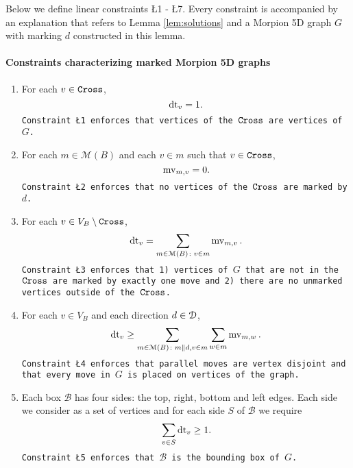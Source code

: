 Below we define linear constraints \L{1} - \L{7}. Every constraint is accompanied by an explanation that refers to Lemma \ref{lem:solutions}
and a Morpion 5D graph $G$ with marking $d$ constructed in this lemma.
\paragraph*{Constraints characterizing marked Morpion 5D graphs} 
  \begin{enumerate}[label=\L{\arabic*}.]
  \item  For each $v \in \texttt{Cross}$,
  \[
    \operatorname{dt}_v = 1.
  \]
\noindent\texttt{\small Constraint \L{1} enforces that vertices of the $\texttt{Cross}$ are vertices of $G$.} %
\vspace{1mm}
  
  \item For each $m \in \mathcal{M}(B)$ and each $v \in m$ such that $v \in \texttt{Cross}$,
  \[
    \operatorname{mv}_{m, v} = 0.
  \]
\noindent\texttt{\small Constraint \L{2} enforces that no vertices of the $\texttt{Cross}$ are marked by $d$. }
\vspace{1mm}

  \item For each $v \in V_B \setminus \texttt{Cross}$, 
  \[ 
    \operatorname{dt}_v = \sum_{m \in \mathcal{M}(B) \colon v \in m} \operatorname{mv}_{m, v}.
  \]
\noindent\texttt{\small Constraint \L{3} enforces that 1) vertices of $G$ that are not in the $\texttt{Cross}$ are 
  marked by exactly one move and 2) there are no unmarked vertices outside of the $\texttt{Cross}$. }
\vspace{1mm}

  \item For each $v \in V_B$ and each direction $d \in \mathcal{D}$,
  \[
  	\operatorname{dt}_v \geq \sum_{m \in \mathcal{M}(B) \colon m \parallel d, v \in m} \sum_{w \in m} \operatorname{mv}_{m, w}.
  \]
\noindent\texttt{\small Constraint \L{4} enforces that parallel moves are vertex disjoint
  and that  every move in $G$ is placed on vertices of the graph. }
\vspace{1mm}

  \item Each box $\mathcal{B}$ has four sides: the top, right, bottom and left edges. Each side we consider as a set of vertices and for each side $S$ of $\mathcal{B}$ we require %
  \[
  \sum_{v \in S} \operatorname{dt}_v \geq 1.
  \]
  \noindent\texttt{\small Constraint \L{5} enforces that $\mathcal{B}$ is the bounding box of $G$. }
\end{enumerate}

